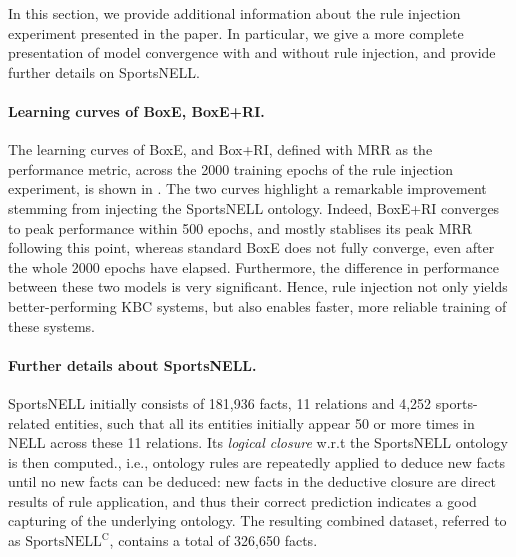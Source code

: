\documentclass{article}
\begin{document}
In this section, we provide additional information about the rule injection experiment presented in the paper. In particular, we give a more complete presentation of model convergence with and without rule injection, and provide further details on SportsNELL. 

\paragraph{Learning curves of BoxE, BoxE+RI.} The learning curves of BoxE, and Box+RI, defined with MRR as the performance metric, across the 2000 training epochs of the rule injection experiment, is shown in . The two curves highlight a remarkable improvement stemming from injecting the SportsNELL ontology. Indeed, BoxE+RI converges to peak performance within 500 epochs, and mostly stablises its peak MRR following this point, whereas standard BoxE does not fully converge, even after the whole 2000 epochs have elapsed. Furthermore, the difference in performance between these two models is very significant. Hence, rule injection not only yields better-performing KBC systems, but also enables faster, more reliable training of these systems.  

\paragraph{Further details about SportsNELL.}
\label{app:SportsNELL}
SportsNELL initially consists of 181,936 facts, 11 relations and 4,252 sports-related entities, such that all its entities initially appear 50 or more times in NELL across these 11 relations. Its \emph{logical closure} w.r.t the SportsNELL ontology is then computed., i.e., ontology rules are repeatedly applied to deduce new facts until no new facts can be deduced: new facts in the deductive closure are direct results of rule application, and thus their correct prediction indicates a good capturing of the underlying ontology. The resulting combined dataset, referred to as $\text{SportsNELL}^\text{C}$, contains a total of 326,650 facts.
\clearpage{}
\end{document}

